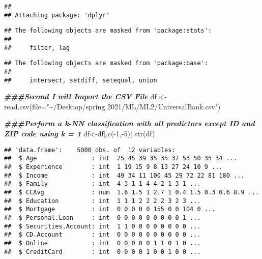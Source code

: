 \documentclass[
]{article}
\newenvironment{Shaded}{\begin{snugshade}}{\end{snugshade}}
\newcommand{\AttributeTok}[1]{\textcolor[rgb]{0.77,0.63,0.00}{#1}}
\newcommand{\DecValTok}[1]{\textcolor[rgb]{0.00,0.00,0.81}{#1}}
\newcommand{\DocumentationTok}[1]{\textcolor[rgb]{0.56,0.35,0.01}{\textbf{\textit{#1}}}}
\newcommand{\FunctionTok}[1]{\textcolor[rgb]{0.00,0.00,0.00}{#1}}
\newcommand{\NormalTok}[1]{#1}
\newcommand{\OtherTok}[1]{\textcolor[rgb]{0.56,0.35,0.01}{#1}}
\newcommand{\SpecialCharTok}[1]{\textcolor[rgb]{0.00,0.00,0.00}{#1}}
\newcommand{\StringTok}[1]{\textcolor[rgb]{0.31,0.60,0.02}{#1}}
\begin{document}
\begin{verbatim}
## 
## Attaching package: 'dplyr'
\end{verbatim}

\begin{verbatim}
## The following objects are masked from 'package:stats':
## 
##     filter, lag
\end{verbatim}

\begin{verbatim}
## The following objects are masked from 'package:base':
## 
##     intersect, setdiff, setequal, union
\end{verbatim}

\begin{Shaded}
\begin{Highlighting}[]
\DocumentationTok{\#\#\#Second I will Import the CSV File}
\NormalTok{df }\OtherTok{\textless{}{-}}\FunctionTok{read.csv}\NormalTok{(}\AttributeTok{file=}\StringTok{"\textasciitilde{}/Desktop/spring 2021/ML/ML2/UniversalBank.csv"}\NormalTok{)}
\end{Highlighting}
\end{Shaded}

\begin{Shaded}
\begin{Highlighting}[]
\DocumentationTok{\#\#\#Perform a k{-}NN classification with all predictors except ID and ZIP code using k = 1}
\NormalTok{df}\OtherTok{\textless{}{-}}\NormalTok{df[,}\FunctionTok{c}\NormalTok{(}\SpecialCharTok{{-}}\DecValTok{1}\NormalTok{,}\SpecialCharTok{{-}}\DecValTok{5}\NormalTok{)]}
\FunctionTok{str}\NormalTok{(df)}
\end{Highlighting}
\end{Shaded}

\begin{verbatim}
## 'data.frame':    5000 obs. of  12 variables:
##  $ Age               : int  25 45 39 35 35 37 53 50 35 34 ...
##  $ Experience        : int  1 19 15 9 8 13 27 24 10 9 ...
##  $ Income            : int  49 34 11 100 45 29 72 22 81 180 ...
##  $ Family            : int  4 3 1 1 4 4 2 1 3 1 ...
##  $ CCAvg             : num  1.6 1.5 1 2.7 1 0.4 1.5 0.3 0.6 8.9 ...
##  $ Education         : int  1 1 1 2 2 2 2 3 2 3 ...
##  $ Mortgage          : int  0 0 0 0 0 155 0 0 104 0 ...
##  $ Personal.Loan     : int  0 0 0 0 0 0 0 0 0 1 ...
##  $ Securities.Account: int  1 1 0 0 0 0 0 0 0 0 ...
##  $ CD.Account        : int  0 0 0 0 0 0 0 0 0 0 ...
##  $ Online            : int  0 0 0 0 0 1 1 0 1 0 ...
##  $ CreditCard        : int  0 0 0 0 1 0 0 1 0 0 ...
\end{verbatim}
\end{document}
